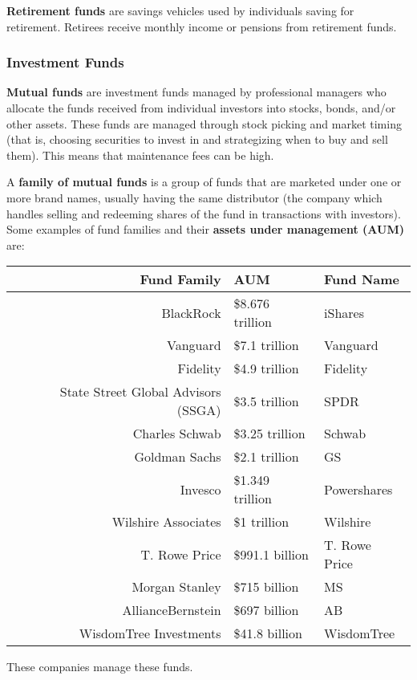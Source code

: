 \documentclass{article}
\begin{document}
      \begin{definition}
        \textbf{Retirement funds} are savings vehicles used by individuals saving for retirement. Retirees receive monthly income or pensions from retirement funds.
      \end{definition}

    \subsubsection{Investment Funds}

      \begin{definition}
        \textbf{Mutual funds} are investment funds managed by professional managers who allocate the funds received from individual investors into stocks, bonds, and/or other assets. These funds are managed through stock picking and market timing (that is, choosing securities to invest in and strategizing when to buy and sell them). This means that maintenance fees can be high. 
      \end{definition}

      \begin{definition}
        A \textbf{family of mutual funds} is a group of funds that are marketed under one or more brand names, usually having the same distributor (the company which handles selling and redeeming shares of the fund in transactions with investors). Some examples of fund families and their \textbf{assets under management (AUM)} are: 
        \begin{center}
        \begin{tabular}{r|l|l}
          Fund Family & AUM & Fund Name\\
          \hline
          BlackRock & \$8.676 trillion & iShares\\
          Vanguard & \$7.1 trillion & Vanguard\\
          Fidelity & \$4.9 trillion & Fidelity\\
          State Street Global Advisors (SSGA) & \$3.5 trillion & SPDR\\
          Charles Schwab & \$3.25 trillion & Schwab\\
          Goldman Sachs & \$2.1 trillion & GS\\
          Invesco & \$1.349 trillion & Powershares\\
          Wilshire Associates & \$1 trillion & Wilshire\\
          T. Rowe Price & \$991.1 billion & T. Rowe Price \\
          Morgan Stanley & \$715 billion & MS\\
          AllianceBernstein & \$697 billion & AB \\
          WisdomTree Investments & \$41.8 billion & WisdomTree
        \end{tabular}
        \end{center}
        These companies manage these funds. 
      \end{definition}
\end{document}
